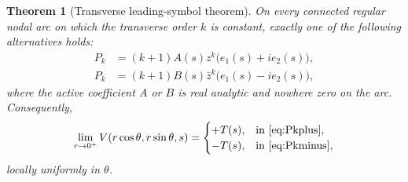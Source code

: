 \documentclass[aps,prd,reprint,nofootinbib,superscriptaddress]{revtex4-2}
\newtheorem{theorem}{Theorem}[section]
\theoremstyle{definition}
\theoremstyle{remark}
\begin{document}
\begin{theorem}[Transverse leading-symbol theorem]
\label{thm:transverse}
On every connected regular nodal arc on which the transverse order $k$ is constant, exactly one of the following alternatives holds:
\begin{align}
P_k&=(k+1)A(s)z^k\bigl(e_1(s)+ie_2(s)\bigr),
\label{eq:Pkplus}\\
P_k&=(k+1)B(s)\bar z^k\bigl(e_1(s)-ie_2(s)\bigr),
\label{eq:Pkminus}
\end{align}
where the active coefficient $A$ or $B$ is real analytic and nowhere zero on the arc. Consequently,
\begin{equation}
\lim_{r\to0^+}V(r\cos\theta,r\sin\theta,s)
=\begin{cases}
+T(s),&\text{in \eqref{eq:Pkplus}},\\
-T(s),&\text{in \eqref{eq:Pkminus}},
\end{cases}
\label{eq:Vtransverselimit}
\end{equation}
locally uniformly in $\theta$.
\end{theorem}
\end{document}
